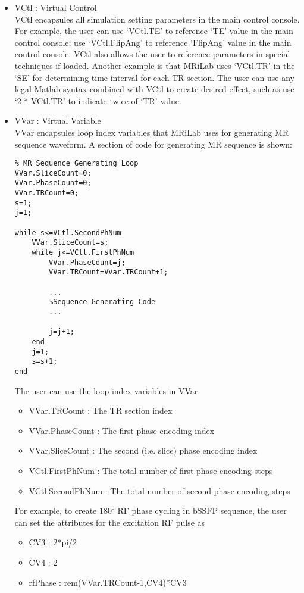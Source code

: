 \documentclass{book}%
\begin{document}
\begin{itemize}
	\item VCtl : Virtual Control \\
VCtl encapsules all simulation setting parameters in the main control console. For example, the user can use `VCtl.TE' to reference `TE' value in the main control console; use `VCtl.FlipAng' to reference `FlipAng' value in the main control console. VCtl also allows the user to reference parameters in special techniques if loaded. Another example is that MRiLab uses `VCtl.TR' in the `SE' for determining time interval for each TR section. The user can use any legal Matlab syntax combined with VCtl to create desired effect, such as use `2 * VCtl.TR' to indicate twice of `TR' value.
	\item VVar : Virtual Variable \\
VVar encapsules loop index variables that MRiLab uses for generating MR sequence waveform. A section of code for generating MR sequence is shown:

\begin{verbatim}
% MR Sequence Generating Loop
VVar.SliceCount=0;
VVar.PhaseCount=0;
VVar.TRCount=0;
s=1;
j=1;

while s<=VCtl.SecondPhNum
    VVar.SliceCount=s;
    while j<=VCtl.FirstPhNum
        VVar.PhaseCount=j;
        VVar.TRCount=VVar.TRCount+1;
				
        ...
        %Sequence Generating Code
        ...
				
        j=j+1;
    end
    j=1;
    s=s+1;
end
\end{verbatim}

The user can use the loop index variables in VVar

\begin{itemize}
	\item VVar.TRCount : The TR section index
	\item VVar.PhaseCount : The first phase encoding index
	\item VVar.SliceCount : The second (i.e. slice) phase encoding index
	\item VCtl.FirstPhNum : The total number of first phase encoding steps
	\item VCtl.SecondPhNum : The total number of second phase encoding steps
\end{itemize}	

For example, to create $180^{\circ}$ RF phase cycling in bSSFP sequence, the user can set the attributes for the excitation RF pulse as

\begin{itemize}
	\item CV3 : 2*pi/2
	\item CV4 : 2
	\item rfPhase : rem(VVar.TRCount-1,CV4)*CV3
\end{itemize}	

\end{itemize}	
\end{document}
